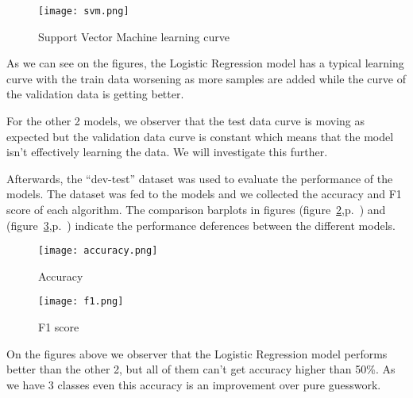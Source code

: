 \documentclass{article}
\begin{document}
  \begin{figure}[H]
  \centering
  \texttt{[image: svm.png]}
  \caption{Support Vector Machine learning curve}
  \label{fig:svm}
  \end{figure}
  
As we can see on the figures, the Logistic Regression model has a typical
learning curve with the train data worsening as more samples are added while the
curve of the validation data is getting better.

For the other 2 models, we observer that the test data curve is moving as
expected but the validation data curve is constant which means that the model
isn't effectively learning the data. We will investigate this further.

Afterwards, the ``dev-test'' dataset was used to evaluate the performance of the
models. The dataset was fed to the models and we collected the accuracy and F1
score of each algorithm. The comparison barplots in figures
(figure~\ref{fig:acc},p.~\pageref{fig:acc}) and
(figure~\ref{fig:f1},p.~\pageref{fig:f1}) indicate the performance deferences
between the different models.

  \begin{figure}[H]
  \centering
  \texttt{[image: accuracy.png]}
  \caption{Accuracy}
  \label{fig:acc}
  \end{figure}
  
  \begin{figure}[H]
  \centering
  \texttt{[image: f1.png]}
  \caption{F1 score}
  \label{fig:f1}
  \end{figure}

On the figures above we observer that the Logistic Regression model performs
better than the other 2, but all of them can't get accuracy higher than 50\%. As
we have 3 classes even this accuracy is an improvement over pure guesswork.
\end{document}
